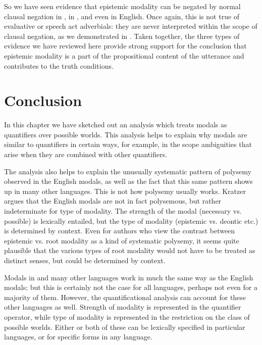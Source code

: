 So we have seen evidence that epistemic modality can be negated by normal clausal negation in , in , and even in English. Once again, this is not true of evaluative or speech act adverbials: they are never interpreted within the scope of clausal negation, as we demonstrated in . Taken together, the three types of evidence we have reviewed here provide strong support for the conclusion that epistemic modality is a part of the propositional content of the utterance and contributes to the truth conditions.


\section{Conclusion}\label{sec:16.6}
\largerpage %
In this chapter we have sketched out an analysis which treats modals as quantifiers over possible worlds. This analysis helps to explain why modals are similar to quantifiers in certain ways, for example, in the scope ambiguities that arise when they are combined with other quantifiers.



The analysis also helps to explain the unusually systematic pattern of polysemy observed in the English modals, as well as the fact that this same pattern shows up in many other languages. This is not how polysemy usually works. Kratzer argues that the English modals are not in fact polysemous, but rather indeterminate for type of modality. The strength of the modal (necessary vs. possible) is lexically entailed, but the type of modality (epistemic vs. deontic etc.) is determined by context. Even for authors who view the contrast between epistemic vs. root modality as a kind of systematic polysemy, it seems quite plausible that the various types of root modality would not have to be treated as distinct senses, but could be determined by context.


Modals in  and many other languages work in much the same way as the English modals; but this is certainly not the case for all languages, perhaps not even for a majority of them. However, the quantificational analysis can account for these other languages as well. Strength of modality is represented in the quantifier operator, while type of modality is represented in the restriction on the class of possible worlds. Either or both of these can be lexically specified in particular languages, or for specific forms in any language.




